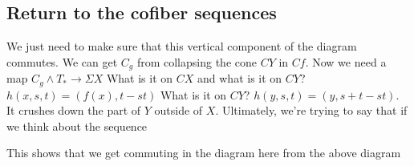 \documentclass[10pt]{article}
\theoremstyle{definition}
\begin{document}
\subsection{Return to the cofiber sequences}
\begin{center}
	
\end{center} 
We just need to make sure that this vertical component of the diagram commutes. We can get $C_g$ from collapsing the cone $CY$ in $Cf$. Now we need a map $C_g\wedge T_\ast\to \Sigma X$ What is it on $CX$ and what is it on $CY$? $h(x,s,t)=(f(x),t-st)$ What is it on $CY$? $h(y,s,t)=(y,s+t-st)$. It crushes down the part of $Y$ outside of $X$. Ultimately, we're trying to say that if we think about the sequence \begin{center}
\end{center}
This shows that we get commuting in the diagram here from the above diagram
\end{document}
